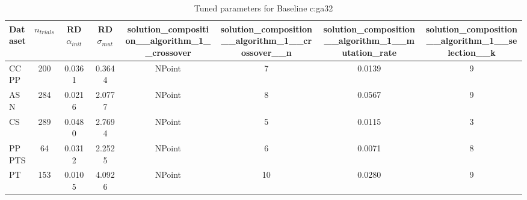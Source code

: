 \begin{table}[ht]
\centering
\caption{Tuned parameters for Baseline c:ga32}
\begin{tabular}{lccccccc}
\hline
Dataset & $n_{trials}$ & \acs{RD} $\alpha_{init}$ & \acs{RD} $\sigma_{mut}$ & solution_composition__algorithm_1__crossover & solution_composition__algorithm_1__crossover__n & solution_composition__algorithm_1__mutation_rate & solution_composition__algorithm_1__selection__k \\
\hline
CCPP & 200 & 0.0361 & 0.3644 & NPoint & 7 & 0.0139 & 9 \\
ASN & 284 & 0.0216 & 2.0777 & NPoint & 8 & 0.0567 & 9 \\
CS & 289 & 0.0480 & 2.7694 & NPoint & 5 & 0.0115 & 3 \\
PPPTS & 64 & 0.0312 & 2.2525 & NPoint & 6 & 0.0071 & 8 \\
PT & 153 & 0.0105 & 4.0926 & NPoint & 10 & 0.0280 & 9 \\
\hline
\end{tabular}
\end{table}